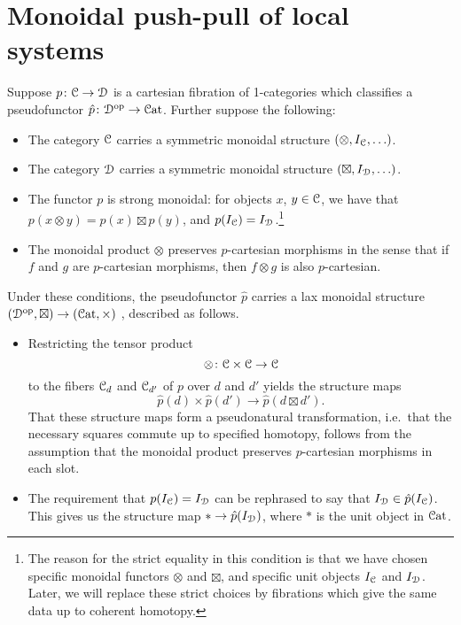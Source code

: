 \documentclass[main.tex]{subfiles}
\begin{document}
\section{Monoidal push-pull of local systems}
\label{sec:the_monoidal_construction}

Suppose $p\colon \mathcal{C} \to \mathcal{D}$ is a cartesian fibration of 1-categories which classifies a pseudofunctor $\hat{p}\colon \mathcal{D}^{\mathrm{op}} \to \mathcal{C}\mathrm{at}$. Further suppose the following:
\begin{itemize}
  \item The category $\mathcal{C}$ carries a symmetric monoidal structure $(\otimes, I_{\mathcal{C}}, \ldots)$.

  \item The category $\mathcal{D}$ carries a symmetric monoidal structure $(\boxtimes, I_{\mathcal{D}}, \ldots)$.

  \item The functor $p$ is strong monoidal: for objects $x$, $y \in \mathcal{C}$, we have that $p(x \otimes y) = p(x) \boxtimes p(y)$, and $p(I_{\mathcal{C}}) = I_{\mathcal{D}}$.\footnote{The reason for the strict equality in this condition is that we have chosen specific monoidal functors $\otimes$ and $\boxtimes$, and specific unit objects $I_{\mathcal{C}}$ and $I_{\mathcal{D}}$. Later, we will replace these strict choices by fibrations which give the same data up to coherent homotopy.}

  \item The monoidal product $\otimes$ preserves $p$-cartesian morphisms in the sense that if $f$ and $g$ are $p$-cartesian morphisms, then $f \otimes g$ is also $p$-cartesian.
\end{itemize}
Under these conditions, the pseudofunctor $\hat{p}$ carries a lax monoidal structure $(\mathcal{D}^{\mathrm{op}}, \boxtimes) \to (\mathcal{C}\mathrm{at}, \times)$ \cite{moeller2018monoidal}, described as follows. 
\begin{itemize}
  \item Restricting the tensor product
    \begin{equation*}
      \otimes\colon \mathcal{C} \times \mathcal{C} \to \mathcal{C}
    \end{equation*}
    to the fibers $\mathcal{C}_{d}$ and $\mathcal{C}_{d'}$ of $p$ over $d$ and $d'$ yields the structure maps
    \begin{equation*}
      \hat{p}(d) \times \hat{p}(d') \to \hat{p}(d \boxtimes d').
    \end{equation*}
    That these structure maps form a pseudonatural transformation, i.e.\ that the necessary squares commute up to specified homotopy, follows from the assumption that the monoidal product preserves $p$-cartesian morphisms in each slot.

  \item The requirement that $p(I_{\mathcal{C}}) = I_{\mathcal{D}}$ can be rephrased to say that $I_{\mathcal{D}} \in \hat{p}(I_{\mathcal{C}})$. This gives us the structure map $\ast \to \hat{p}(I_{\mathcal{D}})$, where $\ast$ is the unit object in $\mathcal{C}\mathrm{at}$.
\end{itemize}
\end{document}
